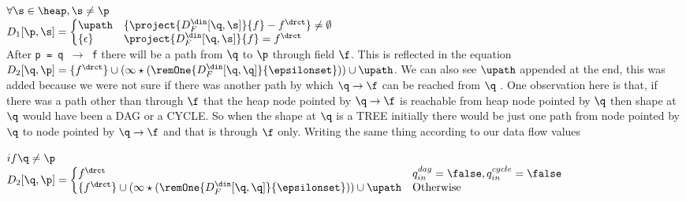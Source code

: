 \begin{itemize}
	$\forall \s \in \heap, \s \not=\p$ \\
	$D_1[\p, \s] =  \left\{\begin{array}{@{}ll}
	                        \upath & \{ \project{D_F^{\din}[\q, \s]}{f} - f^{\drct} \} \not= \emptyset \\
				\{ \epsilon \} & \project{D_F^{\din}[\q, \s]}{f} = f^{\drct}
	                       \end{array}\right.$ 
\\

After {\tt p = q $\rightarrow$ f} there will be a path from $\q$ to $\p$ through field $\f$. This is reflected in the equation
${D_2[\q,\p]} = \{ f^{\drct}\} \cup (\infty \star (\remOne{D_F^{\din}[\q, \q]}{\epsilonset})) \cup \upath$.
We can also see $\upath$ appended at the end, this was added because we were not sure if there was another path by which $\q \rightarrow \f$ can 
be reached from $\q$ .
One observation here is that, if there was a path other than through $\f$ that the heap node pointed by $\q \rightarrow \f$ is reachable from heap node
pointed by $\q$ then shape at $\q$ would have been a DAG or a CYCLE. So when the shape at $\q$ is a TREE initially there would be just
one path from node pointed by $\q$ to node pointed by $\q \rightarrow \f$ and that is through $\f$ only. Writing the same thing according to 
our data flow values

 $if \q \not = \p$  \\
 ${D_2[\q,\p]} = \left\{\begin{array}{@{}ll}
	f^{\drct} & q_{in}^{dag}=\false, q_{in}^{cycle}=\false \\
	\{ f^{\drct}\} \cup (\infty \star (\remOne{D_F^{\din}[\q, \q]}{\epsilonset})) \cup \upath &  \mbox{Otherwise} 
	\end{array}\right.$  \\ \\


\end{itemize}
